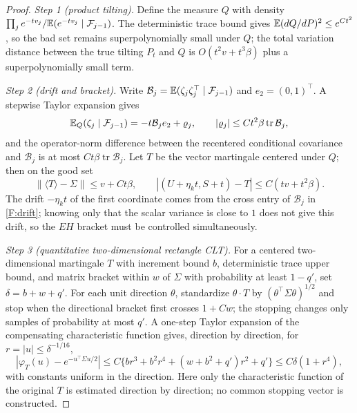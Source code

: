 \begin{proof}
\emph{Step 1 (product tilting).} Define the measure $Q$ with density
$\prod_je^{-tv_j}/\mathbb E(e^{-tv_j}\mid\mathcal F_{j-1})$. The deterministic trace bound gives
$\mathbb E(dQ/dP)^2\le e^{Ct^2}$, so the bad set remains superpolynomially small under $Q$; the total
variation distance between the true tilting $P_t$ and $Q$ is $O(t^2v+t^3\beta)$ plus a
superpolynomially small term.

\emph{Step 2 (drift and bracket).} Write
$\mathcal B_j=\mathbb E(\zeta_j\zeta_j^\top\mid\mathcal F_{j-1})$ and $e_2=(0,1)^\top$. A stepwise
Taylor expansion gives
\begin{equation}
\mathbb E_Q(\zeta_j\mid\mathcal F_{j-1})=-t\mathcal B_je_2+\varrho_j,\qquad|\varrho_j|\le Ct^2\beta\operatorname{tr}\mathcal B_j,\label{F:drift}
\end{equation}
and the operator-norm difference between the recentered conditional covariance and $\mathcal B_j$
is at most $Ct\beta\operatorname{tr}\mathcal B_j$. Let $T$ be the vector martingale centered
under $Q$; then on the good set
\[
\|\langle T\rangle-\Sigma\|\le v+Ct\beta,\qquad|(U+\eta_kt,S+t)-T|\le C(tv+t^2\beta).
\]
The drift $-\eta_kt$ of the first coordinate comes from the cross entry of $\mathcal B_j$ in
\eqref{F:drift}; knowing only that the scalar variance is close to $1$ does not give this drift,
so the $EH$ bracket must be controlled simultaneously.

\emph{Step 3 (quantitative two-dimensional rectangle CLT).} For a centered two-dimensional
martingale $T$ with increment bound $b$, deterministic trace upper bound, and matrix bracket
within $w$ of $\Sigma$ with probability at least $1-q'$, set $\delta=b+w+q'$. For each unit
direction $\theta$, standardize $\theta\cdot T$ by $(\theta^\top\Sigma\theta)^{1/2}$ and stop when
the directional bracket first crosses $1+Cw$; the stopping changes only samples of probability at
most $q'$. A one-step Taylor expansion of the compensating characteristic function gives,
direction by direction, for $r=|u|\le\delta^{-1/16}$,
\[
|\varphi_T(u)-e^{-u^\top\Sigma u/2}|\le C\{br^3+b^2r^4+(w+b^2+q')r^2+q'\}\le C\delta(1+r^4),
\]
with constants uniform in the direction. Here only the characteristic function of the original
$T$ is estimated direction by direction; no common stopping vector is constructed.


\end{proof}
